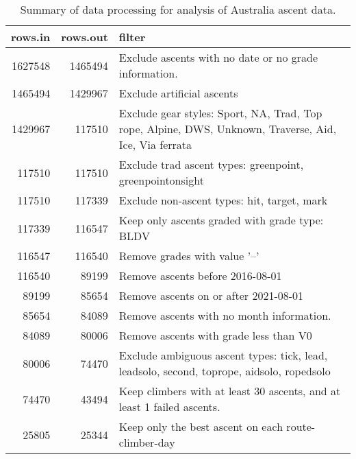 \begin{table}[ht]
\centering
\begingroup\fontsize{9pt}{10pt}\selectfont
\begin{tabular}{rrl}
  \hline
{\bf rows.in} & {\bf rows.out} & {\bf filter} \\ 
  \hline
1627548 & 1465494 & Exclude ascents with no date or no grade information. \\ 
  1465494 & 1429967 & Exclude artificial ascents \\ 
  1429967 & 117510 & Exclude gear styles: Sport, NA, Trad, Top rope, Alpine, DWS, Unknown, Traverse, Aid, Ice, Via ferrata \\ 
  117510 & 117510 & Exclude trad ascent types: greenpoint, greenpointonsight \\ 
  117510 & 117339 & Exclude non-ascent types: hit, target, mark \\ 
  117339 & 116547 & Keep only ascents graded with grade type: BLDV \\ 
  116547 & 116540 & Remove grades with value '--' \\ 
  116540 & 89199 & Remove ascents before 2016-08-01 \\ 
  89199 & 85654 & Remove ascents on or after 2021-08-01 \\ 
  85654 & 84089 & Remove ascents with no month information. \\ 
  84089 & 80006 & Remove ascents with grade less than V0 \\ 
  80006 & 74470 & Exclude ambiguous ascent types: tick, lead, leadsolo, second, toprope, aidsolo, ropedsolo \\ 
  74470 & 43494 & Keep climbers with at least 30 ascents, and at least 1 failed ascents. \\ 
  25805 & 25344 & Keep only the best ascent on each route-climber-day \\ 
   \hline
\end{tabular}
\endgroup
\caption{Summary of data processing for analysis of Australia ascent data.} 
\label{table-data-processing-aus}
\end{table}
